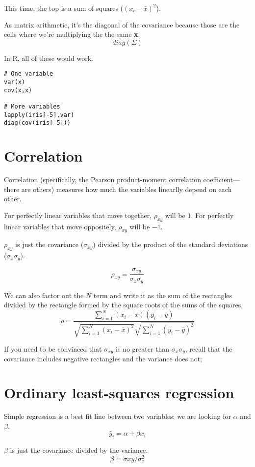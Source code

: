 \documentclass{article}
\begin{document}
This time, the top is a sum of squares ($\left( x_{i}-\bar{x} \right)^2$).

As matrix arithmetic, it's the diagonal of the covariance because those are the cells
where we're multiplying the the same \textbf{x}.
$$ diag\left(\Sigma\right) $$

In R, all of these would work.
\begin{verbatim}
# One variable
var(x)
cov(x,x)

# More variables
lapply(iris[-5],var)
diag(cov(iris[-5]))
\end{verbatim}

\section{Correlation}
Correlation (specifically, the Pearson product-moment correlation coefficient---there are others)
measures how much the variables linearlly depend on each other.

For perfectly linear variables that move together, $\rho_{xy}$ will be $1$.
For perfectly linear variables that move oppositely, $\rho_{xy}$ will be $-1$.

$\rho_{xy}$ is just the covariance ($\sigma_{xy}$) divided by
the product of the standard deviations ($\sigma_x\sigma_y$).

$$ \rho_{xy} = \frac{\sigma_{xy}}{\sigma_x\sigma_y} $$

We can also factor out the $N$ term and write it as the sum of the rectangles divided by
the rectangle formed by the square roots of the sums of the squares.
$$ \rho = \frac
{ \sum_{i=1}^{N}\left( x_{i}-\bar{x} \right) \left( y_{i}-\bar{y} \right) }
{
  \sqrt{\sum_{i=1}^{N}\left( x_{i}-\bar{x} \right)^2}
  \sqrt{\sum_{i=1}^{N}\left( y_{i}-\bar{y} \right)^2}
}
$$

If you need to be convinced that $\sigma_{xy}$ is no greater than $\sigma_x\sigma_y$,
recall that the covariance includes negative rectangles and the variance does not;

\section{Ordinary least-squares regression}
Simple regression is a best fit line between two variables; we are looking for $\alpha$ and $\beta$.
$$ \hat{y}_i = \alpha + \beta x_i$$

$\beta$ is just the covariance divided by the variance.
$$ \beta = \sigma{xy}/\sigma_x^2 $$
\end{document}
